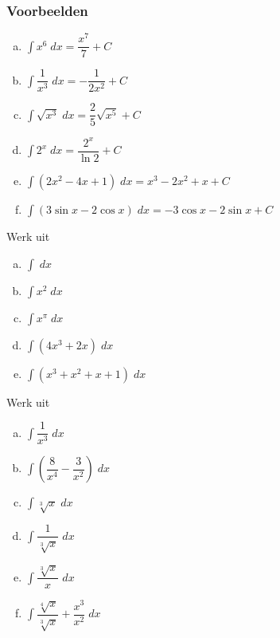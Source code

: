 \documentclass[a4paper,12pt, twoside]{article}
\begin{document}
\needspace{3cm}
\subsubsection*{Voorbeelden}

\begin{enumerate}[(a)]
\item $\displaystyle \int x^6 \;dx = \dfrac{x^7}{7} + C$
\item $\displaystyle \int \dfrac{1}{x^3} \;dx = -\dfrac{1}{2x^2} + C$
\item $\displaystyle \int \sqrt{x^3} \;dx = \dfrac{2}{5}\sqrt{x^5} + C$
\item $\displaystyle \int 2^x \;dx = \dfrac{2^x}{\ln 2} + C$
\item $\displaystyle \int (2x^2 - 4x + 1) \;dx = x^3 - 2x^2 + x + C$
\item $\displaystyle \int (3 \sin x - 2 \cos x) \;dx = -3 \cos x - 2 \sin x + C$
\end{enumerate}

\begin{oefening}
  Werk uit
  \begin{multicols}{2}
    \begin{enumerate}[(a)]
      \itemsep.5em
    \item $\displaystyle \int \;dx$
    \item $\displaystyle \int x^2 \;dx$
    \item $\displaystyle \int x^\pi \;dx$
    \item $\displaystyle \int (4x^3 + 2x) \;dx$
    \item $\displaystyle \int (x^3 + x^2 + x + 1) \;dx$
    \end{enumerate}
  \end{multicols}
\end{oefening}

\begin{oefening}
  Werk uit
  \begin{multicols}{2}
    \begin{enumerate}[(a)]
      \itemsep.5em
    \item $\displaystyle \int \dfrac{1}{x^3} \;dx$
    \item $\displaystyle \int \left(\dfrac{8}{x^4} - \dfrac{3}{x^2}\right) \;dx$
    \item $\displaystyle \int \sqrt[3]{x} \;dx$
    \item $\displaystyle \int \dfrac{1}{\sqrt[3]{x}} \;dx$
    \item $\displaystyle \int \dfrac{\sqrt[3]{x}}{x} \;dx$
    \item $\displaystyle \int \dfrac{\sqrt[4]{x}}{\sqrt[3]{x}} + \dfrac{x^3}{x^2} \;dx$
    \end{enumerate}
  \end{multicols}
\end{oefening}
\end{document}
